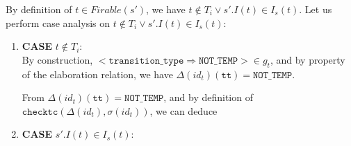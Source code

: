 \documentclass[dvipsnames,12pt]{article}
\begin{document}
\begin{niproof}
\begin{enumerate}
    By definition of $t\in{}Firable(s')$, we have
    $t\notin{}T_i\lor{}s'.I(t)\in{}I_s(t)$. Let us perform case
    analysis on $t\notin{}T_i\lor{}s'.I(t)\in{}I_s(t)$:\\

    \begin{enumerate}
    \item \textbf{CASE} $t\notin{}T_i$: \\

      By construction,
      ${<}\mathtt{transition\_type\Rightarrow{}NOT\_TEMP}{>}\in{}g_t$,
      and by property of the elaboration relation, we have
      $\Delta(id_t)(\texttt{tt})=\mathtt{NOT\_TEMP}$.

      From $\Delta(id_t)(\texttt{tt})=\mathtt{NOT\_TEMP}$, and by definition
      of $\mathtt{checktc}(\Delta(id_t),\sigma(id_t))$, we can deduce

    \item \textbf{CASE} $s'.I(t)\in{}I_s(t)$: \\


\end{enumerate}
\end{enumerate}
\end{niproof}
\end{document}
